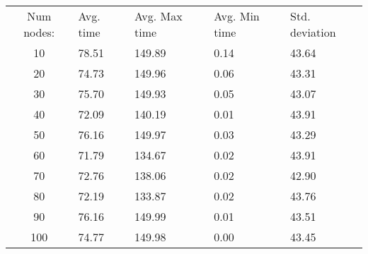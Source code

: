 \begin{tabular}{cllll}
Num nodes: & Avg. time & Avg. Max time & Avg. Min time & Std. deviation \\
10       & 78.51        & 149.89            & 0.14 & 43.64 \\
20       & 74.73        & 149.96            & 0.06 & 43.31 \\
30       & 75.70        & 149.93            & 0.05 & 43.07 \\
40       & 72.09        & 140.19            & 0.01 & 43.91 \\
50       & 76.16        & 149.97            & 0.03 & 43.29 \\
60       & 71.79        & 134.67            & 0.02 & 43.91 \\
70       & 72.76        & 138.06            & 0.02 & 42.90 \\
80       & 72.19        & 133.87            & 0.02 & 43.76 \\
90       & 76.16        & 149.99            & 0.01 & 43.51 \\
100       & 74.77        & 149.98            & 0.00 & 43.45 \\
\end{tabular}